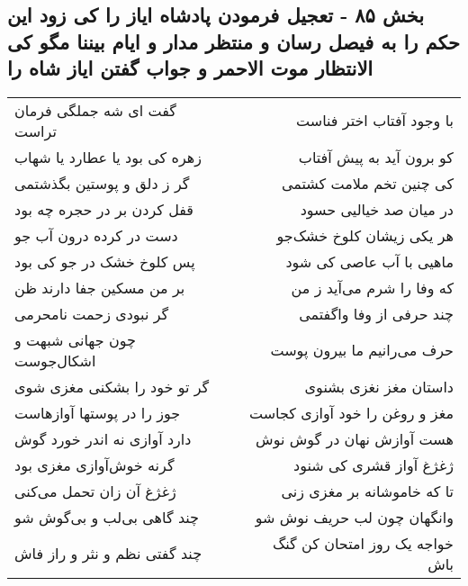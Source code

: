 \begin{center}
\section*{بخش ۸۵ - تعجیل فرمودن پادشاه ایاز را کی زود این حکم را به فیصل رسان و منتظر مدار و ایام بیننا مگو کی الانتظار موت الاحمر و جواب گفتن ایاز شاه را}
\label{sec:sh085}
\begin{longtable}{l p{0.5cm} r}
گفت ای شه جملگی فرمان تراست
&&
با وجود آفتاب اختر فناست
\\
زهره کی بود یا عطارد یا شهاب
&&
کو برون آید به پیش آفتاب
\\
گر ز دلق و پوستین بگذشتمی
&&
کی چنین تخم ملامت کشتمی
\\
قفل کردن بر در حجره چه بود
&&
در میان صد خیالیی حسود
\\
دست در کرده درون آب جو
&&
هر یکی زیشان کلوخ خشک‌جو
\\
پس کلوخ خشک در جو کی بود
&&
ماهیی با آب عاصی کی شود
\\
بر من مسکین جفا دارند ظن
&&
که وفا را شرم می‌آید ز من
\\
گر نبودی زحمت نامحرمی
&&
چند حرفی از وفا واگفتمی
\\
چون جهانی شبهت و اشکال‌جوست
&&
حرف می‌رانیم ما بیرون پوست
\\
گر تو خود را بشکنی مغزی شوی
&&
داستان مغز نغزی بشنوی
\\
جوز را در پوستها آوازهاست
&&
مغز و روغن را خود آوازی کجاست
\\
دارد آوازی نه اندر خورد گوش
&&
هست آوازش نهان در گوش نوش
\\
گرنه خوش‌آوازی مغزی بود
&&
ژغژغ آواز قشری کی شنود
\\
ژغژغ آن زان تحمل می‌کنی
&&
تا که خاموشانه بر مغزی زنی
\\
چند گاهی بی‌لب و بی‌گوش شو
&&
وانگهان چون لب حریف نوش شو
\\
چند گفتی نظم و نثر و راز فاش
&&
خواجه یک روز امتحان کن گنگ باش
\\
\end{longtable}
\end{center}
